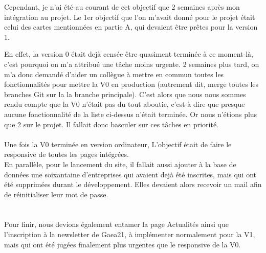 Cependant, je n'ai été au courant de cet objectif que 2 semaines après mon intégration au projet. 
Le 1er objectif que l'on m'avait donné pour le projet était celui des cartes mentionnées en partie A, qui devaient être prêtes pour la version 1. 

En effet, la version 0 était dejà censée être quasiment terminée à ce moment-là, c'est pourquoi on m'a attribué une tâche moins urgente. 
2 semaines plus tard, on m'a donc demandé d'aider un collègue à mettre en commun toutes les fonctionnalités pour mettre la V0 en production 
(autrement dit, merge toutes les branches Git sur la la branche principale).
C'est alors que nous nous sommes rendu compte que la V0 n'était pas du tout aboutie, c'est-à dire que presque aucune fonctionnalité de la liste ci-dessus n'était terminée. 
Or nous n'étions plus que 2 sur le projet. Il fallait donc basculer sur ces tâches en priorité.
\\\\
Une fois la V0 terminée en version ordinateur, L'objectif était de faire le responsive de toutes les pages intégrées. 
\\
En parallèle, pour le lancement du site, il fallait aussi ajouter à la base de données une soixantaine d'entreprises qui avaient dejà été inscrites, mais qui ont été supprimées durant le développement.
Elles devaient alors recevoir un mail afin de réinitialiser leur mot de passe.\\
\\\\
Pour finir, nous devions également entamer la page Actualités ainsi que l'inscription à la newsletter de Gaea21, à implémenter normalement pour la V1, mais qui ont été jugées finalement plus urgentes que le responsive de la V0.

\pagebreak

